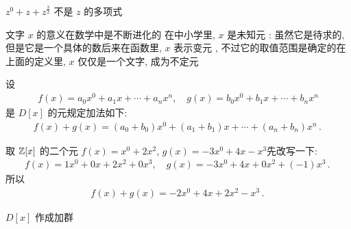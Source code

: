 \begin{example}
    $z^0 + z + z^{\frac{3}{2}}$ 不是 $z$ 的多项式\period
\end{example}

\begin{remark}
    文字 $x$ 的意义在数学中是不断进化的 \period 在中小学里, $x$ 是未知元 : 虽然它是待求的, 但是它是一个具体的数\period 后来在函数里, $x$ 表示变元 , 不过它的取值范围是确定的\period 在上面的定义里, $x$ 仅仅是一个文字, 成为不定元\period
\end{remark}

\begin{definition}
    设
    \begin{align*}
        f(x) = a_0 x^0 + a_1 x + \cdots + a_n x^n, \quad g(x) = b_0 x^0 + b_1 x + \cdots + b_n x^n
    \end{align*}
    是 $D[x]$ 的元\period 规定加法如下:
    \begin{align*}
        f(x) + g(x) = (a_0 + b_0) x^0 + (a_1 + b_1) x + \cdots + (a_n + b_n) x^n \period
    \end{align*}
\end{definition}

\begin{example}
    取 $\mathbb{Z}[x]$ 的二个元 $f(x)=x^0 + 2x^2$, $g(x)=-3x^0 + 4x - x^3$\period 先改写一下:
    \begin{align*}
        f(x) = 1x^0 + 0x + 2x^2 + 0x^3, \quad g(x) = -3x^0 + 4x + 0x^2 + (-1)x^3 \period
    \end{align*}
    所以
    \begin{align*}
        f(x) + g(x) = -2x^0 + 4x + 2x^2 - x^3 \period
    \end{align*}
\end{example}

\begin{proposition}
    $D[x]$ 作成加群\period
\end{proposition}

